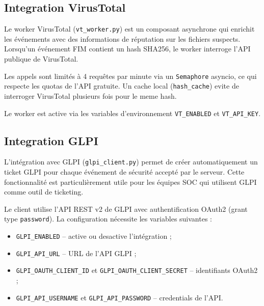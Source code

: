 \subsection{Integration VirusTotal}

Le worker VirusTotal (\texttt{vt\_worker.py}) est un composant asynchrone
qui enrichit les événements avec des informations de réputation sur les
fichiers suspects. Lorsqu'un événement FIM contient un hash SHA256, le
worker interroge l'API publique de VirusTotal.

Les appels sont limités à 4 requêtes par minute via un \texttt{Semaphore}
asyncio, ce qui respecte les quotas de l'API gratuite. Un cache local
(\texttt{hash\_cache}) evite de interroger VirusTotal plusieurs fois pour
le meme hash.

Le worker est active via les variables d'environnement
\texttt{VT\_ENABLED} et \texttt{VT\_API\_KEY}.

\subsection{Integration GLPI}

L'intégration avec GLPI (\texttt{glpi\_client.py}) permet de créer
automatiquement un ticket GLPI pour chaque événement de sécurité accepté
par le serveur. Cette fonctionnalité est particulièrement utile pour les
équipes SOC qui utilisent GLPI comme outil de ticketing.

Le client utilise l'API REST v2 de GLPI avec authentification OAuth2
(grant type \texttt{password}). La configuration nécessite les variables
suivantes :

\begin{itemize}
  \item \texttt{GLPI\_ENABLED} -- active ou desactive l'intégration ;
  \item \texttt{GLPI\_API\_URL} -- URL de l'API GLPI ;
  \item \texttt{GLPI\_OAUTH\_CLIENT\_ID} et
    \texttt{GLPI\_OAUTH\_CLIENT\_SECRET} -- identifiants OAuth2 ;
  \item \texttt{GLPI\_API\_USERNAME} et \texttt{GLPI\_API\_PASSWORD} --
    credentials de l'API.
\end{itemize}

